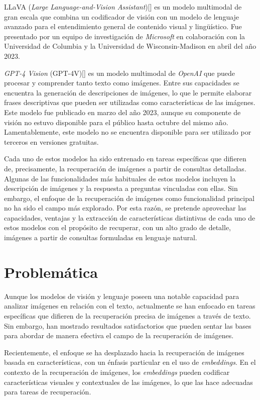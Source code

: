 LLaVA (\textit{Large Language-and-Vision Assistant})[\cite{llava}] es un modelo multimodal de gran escala que combina un codificador de visi\'on con un modelo de lenguaje avanzado para el entendimiento general de contenido visual y lingü\'istico. Fue presentado por un equipo de investigaci\'on de \textit{Microsoft} en colaboraci\'on con la Universidad de Columbia y la Universidad de Wisconsin-Madison en abril del a\~no 2023.

\textit{GPT-4 Vision} (GPT-4V)[\cite{gpt-4v}] es un modelo multimodal de \textit{OpenAI} que puede procesar y comprender tanto texto como imágenes. Entre sus capacidades se encuentra la generación de descripciones de imágenes, lo que le permite elaborar frases descriptivas que pueden ser utilizadas como características de las im\'agenes. Este modelo fue publicado en marzo del a\~no 2023, aunque su componente de visi\'on no estuvo disponible para el p\'ublico hasta octubre del mismo a\~no. Lamentablemente, este modelo no se encuentra disponible para ser utilizado por terceros en versiones gratuitas.

Cada uno de estos modelos ha sido entrenado en tareas específicas que difieren de, precisamente, la recuperación de imágenes a partir de consultas detalladas. Algunas de las funcionalidades más habituales de estos modelos incluyen la descripción de imágenes y la respuesta a preguntas vinculadas con ellas. Sin embargo, el enfoque de la recuperación de imágenes como funcionalidad principal no ha sido el campo más explorado. Por esta razón, se pretende aprovechar las capacidades, ventajas y la extracción de características distintivas de cada uno de estos modelos con el propósito de recuperar, con un alto grado de detalle, imágenes a partir de consultas formuladas en lenguaje natural.

\section*{Problem\'atica}
Aunque los modelos de visión y lenguaje poseen una notable capacidad para analizar imágenes en relación con el texto, actualmente se han enfocado en tareas específicas que difieren de la recuperación precisa de im\'agenes a trav\'es de texto. Sin embargo, han mostrado resultados satisfactorios que pueden sentar las bases para abordar de manera efectiva el campo de la recuperación de imágenes.

Recientemente, el enfoque se ha desplazado hacia la recuperación de imágenes basada en características, con un énfasis particular en el uso de \textit{embeddings}. En el contexto de la recuperación de imágenes, los \textit{embeddings} pueden codificar características visuales y contextuales de las imágenes, lo que las hace adecuadas para tareas de recuperación.

